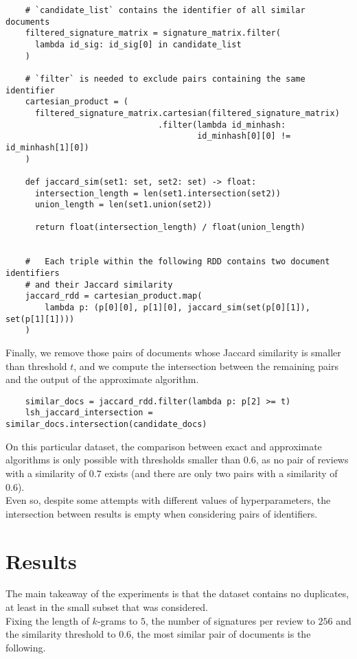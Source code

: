 \documentclass{article}
\begin{document}
  \begin{verbatim}
    # `candidate_list` contains the identifier of all similar documents
    filtered_signature_matrix = signature_matrix.filter(
      lambda id_sig: id_sig[0] in candidate_list
    )

    # `filter` is needed to exclude pairs containing the same identifier
    cartesian_product = (
      filtered_signature_matrix.cartesian(filtered_signature_matrix)
                               .filter(lambda id_minhash:
                                       id_minhash[0][0] != id_minhash[1][0])
    )

    def jaccard_sim(set1: set, set2: set) -> float:
      intersection_length = len(set1.intersection(set2))
      union_length = len(set1.union(set2))

      return float(intersection_length) / float(union_length)


    #   Each triple within the following RDD contains two document identifiers
    # and their Jaccard similarity
    jaccard_rdd = cartesian_product.map(
        lambda p: (p[0][0], p[1][0], jaccard_sim(set(p[0][1]), set(p[1][1])))
    )
  \end{verbatim}
  Finally, we remove those pairs of documents whose Jaccard similarity is
  smaller than threshold \( t \), and we compute the intersection between the
  remaining pairs and the output of the approximate algorithm.
  \begin{verbatim}
    similar_docs = jaccard_rdd.filter(lambda p: p[2] >= t)
    lsh_jaccard_intersection = similar_docs.intersection(candidate_docs)
  \end{verbatim}
  On this particular dataset, the comparison between exact and approximate
  algorithms is only possible with thresholds smaller than \( 0.6 \), as no
  pair of reviews with a similarity of \( 0.7 \) exists (and there are only two
  pairs with a similarity of \( 0.6 \)). \\
  Even so, despite some attempts with different values of hyperparameters, the
  intersection between results is empty when considering pairs of identifiers.

  \section{Results}
  The main takeaway of the experiments is that the dataset contains no
  duplicates, at least in the small subset that was considered. \\
  Fixing the length of \( k \)-grams to \( 5 \), the number of signatures per
  review to \( 256 \) and the similarity threshold to \( 0.6 \), the most
  similar pair of documents is the following. \\
\end{document}
